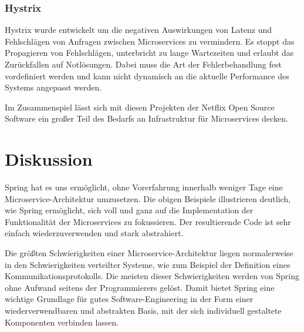 \documentclass{article}
\begin{document}
\subsubsection{Hystrix}

Hystrix wurde entwickelt um die negativen Auswirkungen von Latenz und Fehlschlägen von Anfragen zwischen Microservices zu vermindern.
Es stoppt das Propagieren von Fehlschlägen, unterbricht zu lange Wartezeiten und erlaubt das Zurückfallen auf Notlösungen.
Dabei muss die Art der Fehlerbehandlung fest vordefiniert werden und kann nicht dynamisch an die aktuelle Performance des Systems angepasst werden.\medskip

Im Zusammenspiel lässt sich mit diesen Projekten der Netflix Open Source Software ein großer Teil des Bedarfs an Infrastruktur für Microservices decken.

\section{Diskussion}

Spring hat es uns ermöglicht, ohne Vorerfahrung innerhalb weniger Tage eine Microservice-Architektur umzusetzen.
Die obigen Beispiele illustrieren deutlich, wie Spring ermöglicht, sich voll und ganz auf die Implementation der Funktionalität der Microservices zu fokussieren.
Der resultierende Code ist sehr einfach wiederzuverwenden und stark abstrahiert.

Die größten Schwierigkeiten einer Microservice-Architektur liegen normalerweise in den Schwierigkeiten verteilter Systeme, wie zum Beispiel der Definition eines Kommunikationsprotokolls.
Die meisten dieser Schwierigkeiten werden von Spring ohne Aufwand seitens der Programmierers gelöst.
Damit bietet Spring eine wichtige Grundlage für gutes Software-Engineering in der Form einer wiederverwendbaren und abstrakten Basis, mit der sich individuell gestaltete Komponenten verbinden lassen.



\end{document}
